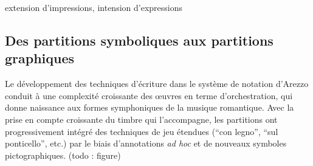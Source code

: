 extension d'impressions, intension d'expressions
\subsection{Des partitions symboliques aux partitions graphiques}

\noindent Le développement des techniques d'écriture dans le système de notation d'Arezzo conduit à une complexité croissante des œuvres en terme d'orchestration, qui donne naissance aux formes symphoniques de la musique romantique. Avec la prise en compte croissante du timbre qui l'accompagne, les partitions ont progressivement intégré des techniques de jeu étendues (``con legno'', ``sul ponticello'', etc.) par le biais d'annotations \textit{ad hoc} et de nouveaux symboles pictographiques. (todo : figure)

